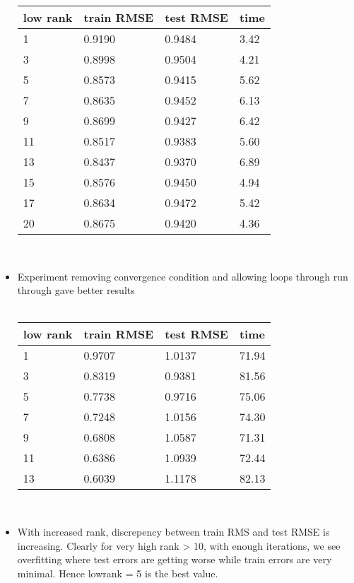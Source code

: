 \documentclass[twoside,10pt]{article}
\begin{document}
\begin{itemize}
     \begin{tabular}{| l | l | l | l | }
    \hline
     low rank   & train RMSE & test RMSE & time  \\ \hline
     1 & 0.9190 & 0.9484 & 3.42 \\ \hline
     3 & 0.8998 & 0.9504 & 4.21 \\ \hline
     5 & 0.8573 & 0.9415 & 5.62 \\ \hline
     7 & 0.8635 & 0.9452 & 6.13 \\ \hline
     9 & 0.8699 & 0.9427 & 6.42 \\ \hline
     11 & 0.8517 & 0.9383 & 5.60 \\ \hline
     13 & 0.8437 & 0.9370 & 6.89 \\ \hline
     15 & 0.8576 & 0.9450 & 4.94 \\ \hline
     17 & 0.8634 & 0.9472 & 5.42 \\ \hline
     20 & 0.8675 & 0.9420 & 4.36 \\ \hline
    \end{tabular}\\
    \item Experiment removing convergence condition and allowing loops through run through gave better results\\ \\
    \begin{tabular}{| l | l | l | l | }
    \hline
     low rank   & train RMSE & test RMSE & time  \\ \hline
     1 & 0.9707 & 1.0137 & 71.94 \\ \hline
     3 & 0.8319 & 0.9381 & 81.56\\ \hline
     5 & 0.7738 & 0.9716 & 75.06 \\ \hline
     7 & 0.7248 & 1.0156 & 74.30 \\ \hline
     9 & 0.6808 & 1.0587 & 71.31 \\ \hline
     11 & 0.6386 & 1.0939 & 72.44 \\ \hline
     13 & 0.6039 & 1.1178 & 82.13 \\ \hline
    \end{tabular}\\
    
    \item With increased rank, discrepency between train RMS and test RMSE is increasing. Clearly for very high rank > 10, with enough iterations, we see overfitting where test errors are getting worse while train errors are very minimal. Hence lowrank = 5 is the best value.
\end{itemize}
%
%
\end{document}
